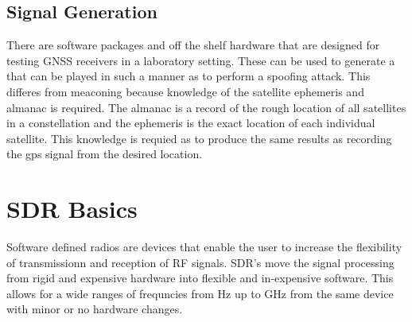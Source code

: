 \subsection{Signal Generation}
There are software packages and off the shelf hardware that are designed for testing GNSS receivers in a laboratory setting. These can be used to generate a that can be
played in such a manner as to perform a spoofing attack. This differes from meaconing because knowledge of the satellite ephemeris and almanac is required. The almanac is
a record of the rough location of all satellites in a constellation and the ephemeris is the exact location of each individual satellite. This knowledge is requied as to
produce the same results as recording the gps signal from the desired location.

\section{SDR Basics}
Software defined radios are devices that enable the user to increase the flexibility of transmissionn and reception of RF signals. SDR's move the signal processing from
rigid and expensive hardware into flexible and in-expensive software. This allows for a wide ranges of frequncies from Hz up to GHz from the same device with minor or no
hardware changes. 